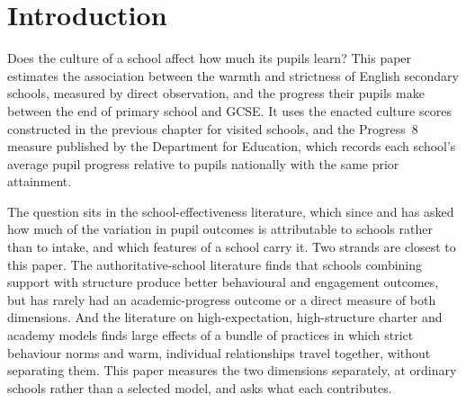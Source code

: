 
\section{Introduction}
\label{sec:p2_intro}

Does the culture of a school affect how much its pupils learn? This paper
estimates the association between the warmth and strictness of English
secondary schools, measured by direct observation, and the progress their
pupils make between the end of primary school and GCSE. It uses the enacted
culture scores constructed in the previous chapter for \NTierOne{} visited
schools, and the Progress~8 measure published by the Department for
Education, which records each school's average pupil progress relative to
pupils nationally with the same prior attainment.

The question sits in the school-effectiveness literature, which since
\citet{coleman1966} and \citet{rutter1979} has asked how much of the variation
in pupil outcomes is attributable to schools rather than to intake, and which
features of a school carry it. Two strands are closest to this paper. The
authoritative-school literature \citep{pellerin2005,gregory2010} finds that
schools combining support with structure produce better behavioural and
engagement outcomes, but has rarely had an academic-progress outcome or a
direct measure of both dimensions. And the literature on high-expectation,
high-structure charter and academy models
\citep{angrist2010,dobbie2013,fryer2014,eyles2019} finds large effects of a
bundle of practices in which strict behaviour norms and warm, individual
relationships travel together, without separating them. This paper measures
the two dimensions separately, at ordinary schools rather than a selected
model, and asks what each contributes.

